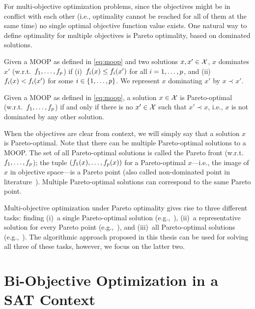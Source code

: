 For multi-objective optimization problems, since the objectives might be in conflict with each other (i.e., optimality cannot be reached for all of them at the same time) no single optimal objective function value exists.
One natural way to define optimality for multiple objectives is Pareto optimality, based on dominated solutions.
\begin{definition}
  Given a MOOP as defined in \cref{eq:moop} and two solutions $x,x' \in \mathcal{X}$, $x$ dominates $x'$ (w.r.t.\ $f_1,\dots,f_p$) if (i)~$f_i(x) \leq f_i(x')$ for all $i=1,\dots,p$, and (ii)~$f_i(x) < f_i(x')$ for some $i\in\{1,\dots,p\}$.
  We represent $x$ dominating $x'$ by $x \prec x'$.
\end{definition}
\begin{definition}
  Given a MOOP as defined in \cref{eq:moop}, a solution $x \in \mathcal{X}$ is Pareto-optimal (w.r.t.\ $f_1,\dots,f_p$) if and only if there is no $x' \in \mathcal{X}$ such that $x' \prec x$, i.e., $x$ is not dominated by any other solution.
\end{definition}
When the objectives are clear from context, we will simply say that a solution $x$ is Pareto-optimal.
Note that there can be multiple Pareto-optimal solutions to a MOOP.
The set of all Pareto-optimal solutions is called the Pareto front (w.r.t.\ $f_1,\dots,f_p$);
the tuple $(f_1(x),\dots,f_p(x))$ for a Pareto-optimal $x$---i.e., the image of $x$ in objective space---is a Pareto point (also called non-dominated point in literature~\autocite{Ehrgott2005-2}).
Multiple Pareto-optimal solutions can correspond to the same Pareto point.

Multi-objective optimization under Pareto optimality gives rise to three different tasks:
finding (i)~a single Pareto-optimal solution (e.g.,~\autocite{Ehrgott2005-3}), (ii)~a representative solution for every Pareto point (e.g.,~\autocite{DBLP:conf/cp/SohBTB17,DBLP:conf/cp/JanotaMSM21}), and (iii)~all Pareto-optimal solutions (e.g.,~\autocite{Isermann1979enumerationallefficient}).
The algorithmic approach proposed in this thesis can be used for solving all three of these tasks, however, we focus on the latter two.

\section{Bi-Objective Optimization in a SAT Context\label{sec:biopt}}

